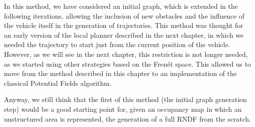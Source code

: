 In this method, we have considered an initial graph, which is extended in the following iterations, allowing the inclusion of new obstacles and the influence of the vehicle itself in the generation of trajectories. This method was thought for an early version of the local planner described in the next chapter, in which we needed the trajectory to start just from the current position of the vehicle. However, as we will see in the next chapter, this restriction is not longer needed, as we started using other strategies based on the Frenét space. This allowed us to move from the method described in this chapter to an implementation of the classical Potential Fields algorithm. 

Anyway, we still think that the first of this method (the initial graph generation step) would be a good starting point for, given an occupancy map in which an unstructured area is represented, the generation of a full \ac{RNDF} from the scratch.

